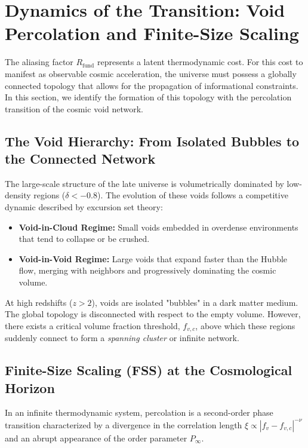 \documentclass[12pt, a4paper]{article}
\theoremstyle{plain}
\theoremstyle{definition}
\begin{document}
\section{Dynamics of the Transition: Void Percolation and Finite-Size Scaling}
\label{sec:percolation}

The aliasing factor $R_{\text{fund}}$ represents a latent thermodynamic cost. For this cost to manifest as observable cosmic acceleration, the universe must possess a globally connected topology that allows for the propagation of informational constraints. In this section, we identify the formation of this topology with the percolation transition of the cosmic void network.

\subsection{The Void Hierarchy: From Isolated Bubbles to the Connected Network}

The large-scale structure of the late universe is volumetrically dominated by low-density regions ($\delta < -0.8$). The evolution of these voids follows a competitive dynamic described by excursion set theory:
\begin{itemize}
    \item \textbf{Void-in-Cloud Regime:} Small voids embedded in overdense environments that tend to collapse or be crushed.
    \item \textbf{Void-in-Void Regime:} Large voids that expand faster than the Hubble flow, merging with neighbors and progressively dominating the cosmic volume.
\end{itemize}

At high redshifts ($z > 2$), voids are isolated "bubbles" in a dark matter medium. The global topology is disconnected with respect to the empty volume. However, there exists a critical volume fraction threshold, $f_{v,c}$, above which these regions suddenly connect to form a \textit{spanning cluster} or infinite network.

\subsection{Finite-Size Scaling (FSS) at the Cosmological Horizon}

In an infinite thermodynamic system, percolation is a second-order phase transition characterized by a divergence in the correlation length $\xi \propto |f_v - f_{v,c}|^{-\nu}$ and an abrupt appearance of the order parameter $P_{\infty}$.
\end{document}
